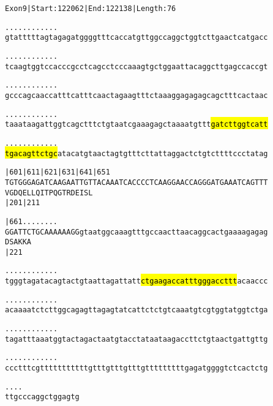 \documentclass{article}
\begin{document}
\begin{alltt}
Exon 9 | Start: 122062 | End: 122138 | Length: 76

.    .    .    .    .    .    .    .    .    .    .    .    
gtatttttagtagagatggggtttcaccatgttggccaggctggtcttgaactcatgacc

.    .    .    .    .    .    .    .    .    .    .    .    
tcaagtggtccacccgcctcagcctcccaaagtgctggaattacaggcttgagccaccgt

.    .    .    .    .    .    .    .    .    .    .    .    
gcccagcaaccatttcatttcaactagaagtttctaaaggagagagcagctttcactaac

.    .    .    .    .    .    .    .    .    .    .    .    
taaataagattggtcagctttctgtaatcgaaagagctaaaatgttt\hl{gatcttggtcatt}

.    .    .    .    .    .    .    .    .    .    .    .    
\hl{tgacagttctgc}atacatgtaactagtgtttcttattaggactctgtcttttccctatag

       |601      |611      |621      |631      |641      |651
TGTGGGAGATCAAGAATTGTTACAAATCACCCCTCAAGGAACCAGGGATGAAATCAGTTT
 V  G  D  Q  E  L  L  Q  I  T  P  Q  G  T  R  D  E  I  S  L 
       |201                          |211                   

       |661          .    .    .    .    .    .    .    .   
GGATTCTGCAAAAAAGGgtaatggcaaagtttgccaacttaacaggcactgaaaagagag
 D  S  A  K  K  A                                           
       |221                                                 

 .    .    .    .    .    .    .    .    .    .    .    .   
tgggtagatacagtactgtaattagattatt\hl{ctgaagaccatttgggaccttt}acaaccc

 .    .    .    .    .    .    .    .    .    .    .    .   
acaaaatctcttggcagagttagagtatcattctctgtcaaatgtcgtggtatggtctga

 .    .    .    .    .    .    .    .    .    .    .    .   
tagatttaaatggtactagactaatgtacctataataagaccttctgtaactgattgttg

 .    .    .    .    .    .    .    .    .    .    .    .   
ccctttcgtttttttttttgtttgtttgtttgtttttttttgagatggggtctcactctg

 .    .    .    .
ttgcccaggctggagtg
\end{alltt}
\newpage
\end{document}
